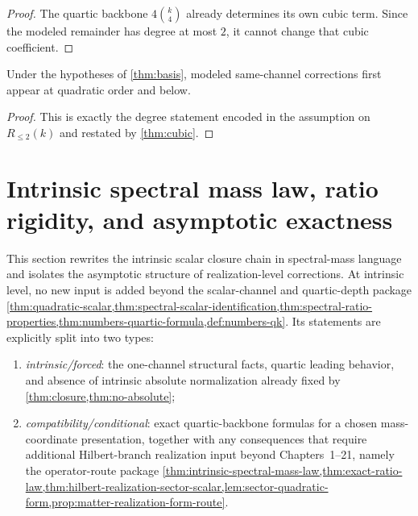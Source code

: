 \begin{proof}
The quartic backbone \(4\binom{k}{4}\) already determines its own cubic
term. Since the modeled remainder has degree at most \(2\), it cannot
change that cubic coefficient.
\end{proof}

\begin{proposition}
\label{prop:correction-structure}
Under the hypotheses of \cref{thm:basis}, modeled same-channel
corrections first appear at quadratic order and below.
\end{proposition}

\begin{proof}
This is exactly the degree statement encoded in the assumption on
\(R_{\le2}(k)\) and restated by \cref{thm:cubic}.
\end{proof}

\section{Intrinsic spectral mass law, ratio rigidity, and asymptotic exactness}
\label{sec:intrinsic-spectral-mass-law}

This section rewrites the intrinsic scalar closure chain in spectral-mass
language and isolates the asymptotic structure of realization-level
corrections.
At intrinsic level, no new input is added beyond the scalar-channel and
quartic-depth package
\cref{thm:quadratic-scalar,thm:spectral-scalar-identification,thm:spectral-ratio-properties,thm:numbers-quartic-formula,def:numbers-qk}.
Its statements are explicitly split into two types:
\begin{enumerate}[label=\textup{(\roman*)}]
\item \emph{intrinsic/forced}: the one-channel structural facts,
      quartic leading behavior, and absence of intrinsic absolute
      normalization already fixed by
      \cref{thm:closure,thm:no-absolute};
\item \emph{compatibility/conditional}: exact quartic-backbone formulas
      for a chosen mass-coordinate presentation, together with any
      consequences that require additional
      Hilbert-branch realization input beyond Chapters~1--21, namely the
      operator-route package
      \cref{thm:intrinsic-spectral-mass-law,thm:exact-ratio-law,thm:hilbert-realization-sector-scalar,lem:sector-quadratic-form,prop:matter-realization-form-route}.
\end{enumerate}

